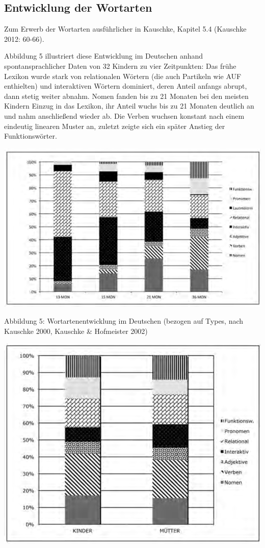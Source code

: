 \documentclass[
  letterpaper,
]{scrbook}
\begin{document}
\hypertarget{entwicklung-der-wortarten}{%
\subsection{Entwicklung der Wortarten}\label{entwicklung-der-wortarten}}

Zum Erwerb der Wortarten ausführlicher in Kauschke, Kapitel 5.4
(Kauschke 2012: 60-66).

Abbildung 5 illustriert diese Entwicklung im Deutschen anhand
spontansprachlicher Daten von 32 Kindern zu vier Zeitpunkten: Das frühe
Lexikon wurde stark von relationalen Wörtern (die auch Partikeln wie AUF
enthielten) und interaktiven Wörtern dominiert, deren Anteil anfangs
abrupt, dann stetig weiter abnahm. Nomen fanden bis zu 21 Monaten bei
den meisten Kindern Einzug in das Lexikon, ihr Anteil wuchs bis zu 21
Monaten deutlich an und nahm anschließend wieder ab. Die Verben wuchsen
konstant nach einem eindeutig linearen Muster an, zuletzt zeigte sich
ein später Anstieg der Funktionswörter.

\includegraphics[width=1\textwidth,height=\textheight]{./pictures/kauschke_abb5.png}

Abbildung 5: Wortartenentwicklung im Deutschen (bezogen auf Types, nach
Kauschke 2000, Kauschke \& Hofmeister 2002)

\includegraphics[width=1\textwidth,height=\textheight]{./pictures/kauschke_abb6.png}
\end{document}
